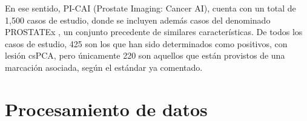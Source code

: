 En ese sentido, PI-CAI (Prostate Imaging: Cancer AI), cuenta con un total de 1,500 casos de estudio, donde se incluyen además casos del denominado PROSTATEx , un conjunto precedente de similares características. De todos los casos de estudio, 425 son los que han sido determinados como positivos, con lesión csPCA, pero únicamente 220 son aquellos que están provistos de una marcación asociada, según el estándar ya comentado.




\section{Procesamiento de datos}

